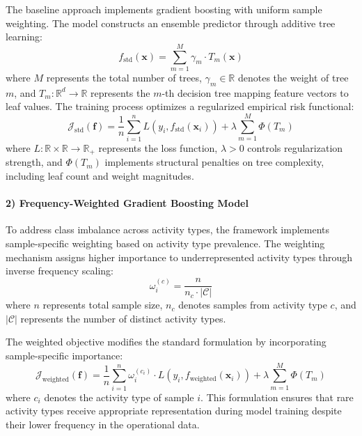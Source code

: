 \documentclass[preprint,12pt]{elsarticle}
\begin{document}
The baseline approach implements gradient boosting with uniform sample weighting. The model constructs an ensemble predictor through additive tree learning:
\begin{equation}
f_{\text{std}}(\mathbf{x}) = \sum_{m=1}^{M} \gamma_m \cdot T_m(\mathbf{x})
\end{equation}
where $M$ represents the total number of trees, $\gamma_m \in \mathbb{R}$ denotes the weight of tree $m$, and $T_m: \mathbb{R}^d \to \mathbb{R}$ represents the $m$-th decision tree mapping feature vectors to leaf values. The training process optimizes a regularized empirical risk functional:
\begin{equation}
\label{baseline_loss}
\mathcal{J}_{\text{std}}(\mathbf{f}) = \frac{1}{n} \sum_{i=1}^{n} L(y_i, f_{\text{std}}(\mathbf{x}_i)) + \lambda \sum_{m=1}^{M} \Phi(T_m)
\end{equation}
where $L: \mathbb{R} \times \mathbb{R} \to \mathbb{R}_+$ represents the loss function, $\lambda > 0$ controls regularization strength, and $\Phi(T_m)$ implements structural penalties on tree complexity, including leaf count and weight magnitudes.


\paragraph{2) Frequency-Weighted Gradient Boosting Model}

To address class imbalance across activity types, the framework implements sample-specific weighting based on activity type prevalence. The weighting mechanism assigns higher importance to underrepresented activity types through inverse frequency scaling:
\begin{equation}
\omega_i^{(c)} = \frac{n}{n_c \cdot |\mathcal{C}|}
\end{equation}
where $n$ represents total sample size, $n_c$ denotes samples from activity type $c$, and $|\mathcal{C}|$ represents the number of distinct activity types.

The weighted objective modifies the standard formulation by incorporating sample-specific importance:
\begin{equation}
\mathcal{J}_{\text{weighted}}(\mathbf{f}) = \frac{1}{n} \sum_{i=1}^{n} \omega_i^{(c_i)} \cdot L(y_i, f_{\text{weighted}}(\mathbf{x}_i)) + \lambda \sum_{m=1}^{M} \Phi(T_m)
\end{equation}
where $c_i$ denotes the activity type of sample $i$. This formulation ensures that rare activity types receive appropriate representation during model training despite their lower frequency in the operational data.
\end{document}
